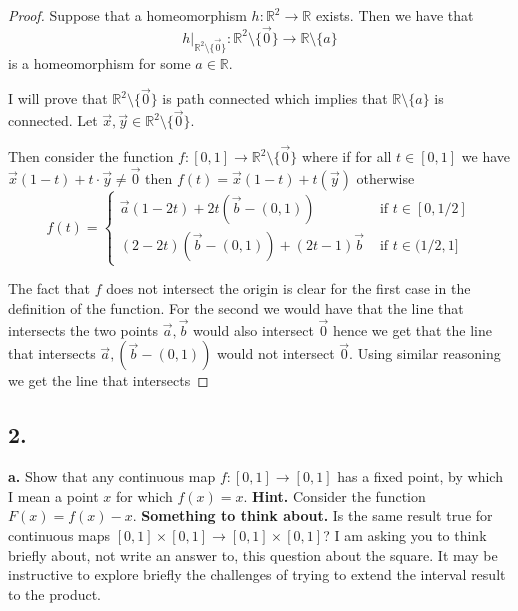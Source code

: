 \documentclass{amsart}
\theoremstyle{plain}
\theoremstyle{definition}
\theoremstyle{remark}
\begin{document}
\begin{proof}
    Suppose that a homeomorphism $h: \mathbb{R}^2\to \mathbb R$ exists. Then we have that $$h|_{\mathbb{R}^2\setminus \{\vec 0\}}:\mathbb{R}^2 \setminus \{\vec 0\}\to \mathbb R \setminus \{a\}$$ is a homeomorphism for some $a\in \mathbb R$. 
    
    I will prove that $\mathbb{R}^2\setminus \{\vec 0\}$ is path connected which implies that $\mathbb R \setminus \{a\}$ is  connected. Let $\vec{x},\vec{y}\in \mathbb{R}^2\setminus \{\vec{0}\}$. 
    
    Then consider the function $f:[0,1]\to \mathbb{R}^2\setminus \{\vec{0}\}$ where if for all $t\in [0,1]$ we have $\vec{x}(1-t)+t\cdot  \vec{y}\not = \vec 0$ then $f(t)=\vec{x}(1-t)+t(\vec{y})$ otherwise 
    \begin{equation}
        f(t)=\begin{cases}
            \vec{a}(1-2t)+2t (\vec{b}-(0,1)) & \text{ if } t\in [0,1/2]\\
            (2-2t)(\vec b - (0,1))+ (2t-1)\vec b & \text{ if } t \in (1/2,1]
        \end{cases}
    \end{equation}

    The fact that $f$ does not intersect the origin is clear for the first case in the definition of the function. For the second we would have that the line that intersects the two points $\vec{a},\vec{b}$ would also intersect $\vec{0}$ hence we get that the line that intersects $\vec{a},(\vec{b}-(0,1))$ would not intersect $\vec{0}$. Using similar reasoning we get the line that intersects 



\end{proof}



\vspace{.15in}
\noindent
\subsection*{2.} 

{\bfseries a.}  Show that any continuous map $f : [0,1] \rightarrow [0,1]$ has a fixed point, by which I mean a point $x$ for which $f(x) = x$. {\bfseries Hint.} Consider the function $F(x) = f(x) - x$. {\bfseries Something to think about.} Is the same result true for continuous maps $[0,1] \times [0,1] \rightarrow [0,1] \times [0,1]$? I am asking you to think briefly about, not write an answer to, this question about the square. It may be instructive to explore briefly the challenges of trying to extend the interval result to the product. 
\end{document}
